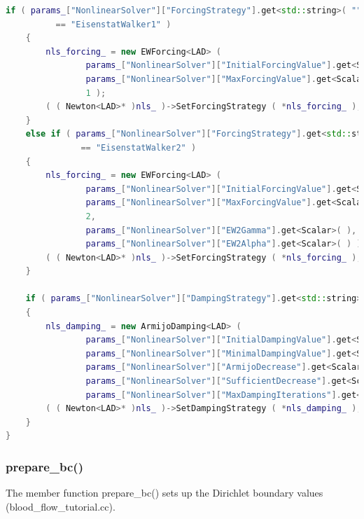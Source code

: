 \documentclass[a4paper, 11pt, twoside]{article}
\begin{document}
\begin{lstlisting}[language=C++, basicstyle={\footnotesize, \ttfamily}, keywordstyle=\color{blue},  numbers=none, tabsize=4]
    if ( params_["NonlinearSolver"]["ForcingStrategy"].get<std::string>( "" ) 
          == "EisenstatWalker1" )
    {
        nls_forcing_ = new EWForcing<LAD> ( 
        	    params_["NonlinearSolver"]["InitialForcingValue"].get<Scalar>( ),
                params_["NonlinearSolver"]["MaxForcingValue"].get<Scalar>( ),
                1 );
        ( ( Newton<LAD>* )nls_ )->SetForcingStrategy ( *nls_forcing_ );
    }
    else if ( params_["NonlinearSolver"]["ForcingStrategy"].get<std::string>( "" ) 
    		   == "EisenstatWalker2" )
    {
        nls_forcing_ = new EWForcing<LAD> ( 
                params_["NonlinearSolver"]["InitialForcingValue"].get<Scalar>( ),
                params_["NonlinearSolver"]["MaxForcingValue"].get<Scalar>( ),
                2,
                params_["NonlinearSolver"]["EW2Gamma"].get<Scalar>( ),
                params_["NonlinearSolver"]["EW2Alpha"].get<Scalar>( ) );
        ( ( Newton<LAD>* )nls_ )->SetForcingStrategy ( *nls_forcing_ );
    }

    if ( params_["NonlinearSolver"]["DampingStrategy"].get<std::string>( "" ) == "Armijo" )
    {
        nls_damping_ = new ArmijoDamping<LAD> (
                params_["NonlinearSolver"]["InitialDampingValue"].get<Scalar>( ),
                params_["NonlinearSolver"]["MinimalDampingValue"].get<Scalar>( ),
                params_["NonlinearSolver"]["ArmijoDecrease"].get<Scalar>( ),
                params_["NonlinearSolver"]["SufficientDecrease"].get<Scalar>( ),
                params_["NonlinearSolver"]["MaxDampingIterations"].get<int>( ) );
        ( ( Newton<LAD>* )nls_ )->SetDampingStrategy ( *nls_damping_ );
    }
}
\end{lstlisting}


\subsubsection{prepare\_bc()} \label{sec:prepare_bc}
The member function prepare\_bc() sets up the Dirichlet boundary values (blood\_flow\_tutorial.cc).
\end{document}
